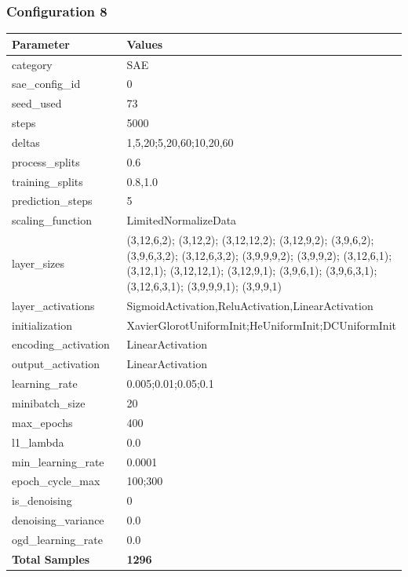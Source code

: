 \documentclass[a4paper,11pt,oneside]{article}
\theoremstyle{plain}
\theoremstyle{definition}
\begin{document}
	\newpage
	\subsubsection{Configuration 8}\label{config8}
	\begin{longtable}[H]{|p{0.3\linewidth}|p{0.7\linewidth}|} \hline \textbf{Parameter} &\textbf{Values} \\\hline{category} & {SAE} \\\hline
		{sae\_config\_id} & {0} \\\hline
		{seed\_used} & {73} \\\hline
		{steps} & {5000} \\\hline
		{deltas} & {1,5,20;5,20,60;10,20,60} \\\hline
		{process\_splits} & {0.6} \\\hline
		{training\_splits} & {0.8,1.0} \\\hline
		{prediction\_steps} & {5} \\\hline
		{scaling\_function} & {LimitedNormalizeData} \\\hline
		{layer\_sizes} & {(3,12,6,2); (3,12,2); (3,12,12,2); (3,12,9,2); (3,9,6,2); (3,9,6,3,2); (3,12,6,3,2); (3,9,9,9,2); (3,9,9,2); (3,12,6,1); (3,12,1); (3,12,12,1); (3,12,9,1); (3,9,6,1); (3,9,6,3,1); (3,12,6,3,1); (3,9,9,9,1); (3,9,9,1)} \\\hline
		{layer\_activations} & {SigmoidActivation,ReluActivation,LinearActivation} \\\hline
		{initialization} & {XavierGlorotUniformInit;HeUniformInit;DCUniformInit} \\\hline
		{encoding\_activation} & {LinearActivation} \\\hline
		{output\_activation} & {LinearActivation} \\\hline
		{learning\_rate} & {0.005;0.01;0.05;0.1} \\\hline
		{minibatch\_size} & {20} \\\hline
		{max\_epochs} & {400} \\\hline
		{l1\_lambda} & {0.0} \\\hline
		{min\_learning\_rate} & {0.0001} \\\hline
		{epoch\_cycle\_max} & {100;300} \\\hline
		{is\_denoising} & {0} \\\hline
		{denoising\_variance} & {0.0} \\\hline
		{ogd\_learning\_rate} & {0.0} \\\hline
		{\textbf{Total Samples}} & {\textbf{1296}} \\\hline
	\end{longtable}
	
\end{document}
